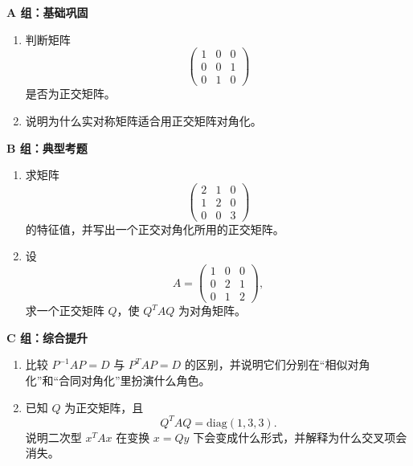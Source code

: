 \documentclass[11pt,oneside,UTF8]{ctexbook}
\begin{document}
\begin{exercisebox}[第 4 章分级习题]
\textbf{A 组：基础巩固}
\begin{enumerate}[label=\textbf{A\arabic*.}]
  \item 判断矩阵
  \[
  \begin{pmatrix}
  1&0&0\\
  0&0&1\\
  0&1&0
  \end{pmatrix}
  \]
  是否为正交矩阵。
  \item 说明为什么实对称矩阵适合用正交矩阵对角化。
\end{enumerate}

\textbf{B 组：典型考题}
\begin{enumerate}[label=\textbf{B\arabic*.}]
  \item 求矩阵
  \[
  \begin{pmatrix}
  2&1&0\\
  1&2&0\\
  0&0&3
  \end{pmatrix}
  \]
  的特征值，并写出一个正交对角化所用的正交矩阵。
  \item 设
  \[
  A=
  \begin{pmatrix}
  1&0&0\\
  0&2&1\\
  0&1&2
  \end{pmatrix},
  \]
  求一个正交矩阵 \(Q\)，使 \(Q^TAQ\) 为对角矩阵。
\end{enumerate}

\textbf{C 组：综合提升}
\begin{enumerate}[label=\textbf{C\arabic*.}]
  \item 比较 \(P^{-1}AP=D\) 与 \(P^TAP=D\) 的区别，并说明它们分别在“相似对角化”和“合同对角化”里扮演什么角色。
  \item 已知 \(Q\) 为正交矩阵，且
  \[
  Q^TAQ=\mathrm{diag}(1,3,3).
  \]
  说明二次型 \(x^TAx\) 在变换 \(x=Qy\) 下会变成什么形式，并解释为什么交叉项会消失。
\end{enumerate}
\end{exercisebox}
\end{document}
